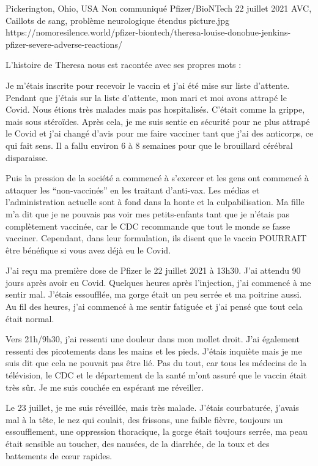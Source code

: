 {Pickerington, Ohio, USA}
{Non communiqué}
{Pfizer/BioNTech}
{22 juillet 2021}
{AVC, Caillots de sang, problème neurologique étendus}
{picture.jpg}
{https://nomoresilence.world/pfizer-biontech/theresa-louise-donohue-jenkins-pfizer-severe-adverse-reactions/}
{

\normalsize

L'histoire de Theresa nous est racontée avec ses propres mots :

Je m'étais inscrite pour recevoir le vaccin et j'ai été mise sur liste
d'attente. Pendant que j'étais sur la liste d'attente, mon mari et moi avons
attrapé le Covid. Nous étions très malades mais pas hospitalisés. C'était comme
la grippe, mais sous stéroïdes. Après cela, je me suis sentie en sécurité pour
ne plus attrapé le Covid et j'ai changé d'avis pour me faire vacciner tant que
j'ai des anticorps, ce qui fait sens. Il a fallu environ 6 à 8 semaines pour que
le brouillard cérébral disparaisse.

Puis la pression de la société a commencé à s'exercer et les gens ont commencé à
attaquer les “non-vaccinés” en les traitant d'anti-vax. Les médias et
l'administration actuelle sont à fond dans la honte et la culpabilisation. Ma
fille m'a dit que je ne pouvais pas voir mes petits-enfants tant que je n'étais
pas complètement vaccinée, car le CDC recommande que tout le monde se fasse
vacciner. Cependant, dans leur formulation, ils disent que le vaccin POURRAIT
être bénéfique si vous avez déjà eu le Covid.

J'ai reçu ma première dose de Pfizer le 22 juillet 2021 à 13h30. J'ai attendu 90
jours après avoir eu Covid. Quelques heures après l'injection, j'ai commencé à
me sentir mal. J'étais essoufflée, ma gorge était un peu serrée et ma poitrine
aussi. Au fil des heures, j'ai commencé à me sentir fatiguée et j'ai pensé que
tout cela était normal.

Vers 21h/9h30, j'ai ressenti une douleur dans mon mollet droit. J'ai également
ressenti des picotements dans les mains et les pieds. J'étais inquiète mais je
me suis dit que cela ne pouvait pas être lié. Pas du tout, car tous les médecins
de la télévision, le CDC et le département de la santé m'ont assuré que le
vaccin était très sûr. Je me suis couchée en espérant me réveiller.

Le 23 juillet, je me suis réveillée, mais très malade. J'étais courbaturée,
j'avais mal à la tête, le nez qui coulait, des frissons, une faible fièvre,
toujours un essoufflement, une oppression thoracique, la gorge était toujours
serrée, ma peau était sensible au toucher, des nausées, de la diarrhée, de la
toux et des battements de cœur rapides.

}
